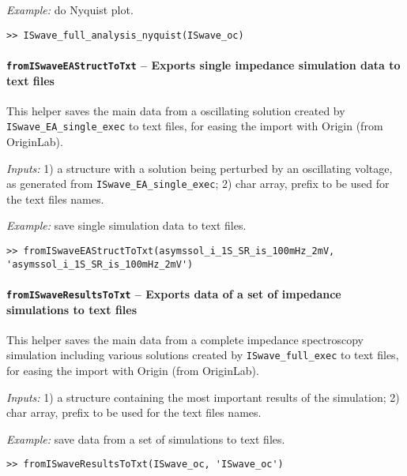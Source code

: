 	\textit{Example:} do Nyquist plot.
	\begin{lstlisting}[style=Matlab-editor]
>> ISwave_full_analysis_nyquist(ISwave_oc)
\end{lstlisting}




	\paragraph{\texttt{from\-ISwaveEA\-Struct\-ToTxt} -- Exports single impedance simulation data to text files}
	This helper saves the main data from a oscillating solution created by \texttt{ISwave\_EA\_single\_exec} to text files, for easing the import with Origin (from OriginLab).

	\textit{Inputs:} 1) a structure with a solution being perturbed by an oscillating voltage, as generated from \texttt{ISwave\_EA\_single\_exec};
	2) char array, prefix to be used for the text files names.




	\textit{Example:} save single simulation data to text files.
	\begin{lstlisting}[style=Matlab-editor]
>> fromISwaveEAStructToTxt(asymssol_i_1S_SR_is_100mHz_2mV, 'asymssol_i_1S_SR_is_100mHz_2mV')
\end{lstlisting}

	\paragraph{\texttt{from\-ISwave\-Results\-ToTxt} -- Exports data of a set of impedance simulations to text files}
	This helper saves the main data from a complete impedance spectroscopy simulation including various solutions created by \texttt{ISwave\_full\_exec} to text files, for easing the import with Origin (from OriginLab).

	\textit{Inputs:} 1) a structure containing the most important results of the simulation;
	2) char array, prefix to be used for the text files names.




	\textit{Example:} save data from a set of simulations to text files.
	\begin{lstlisting}[style=Matlab-editor]
>> fromISwaveResultsToTxt(ISwave_oc, 'ISwave_oc')
\end{lstlisting}


